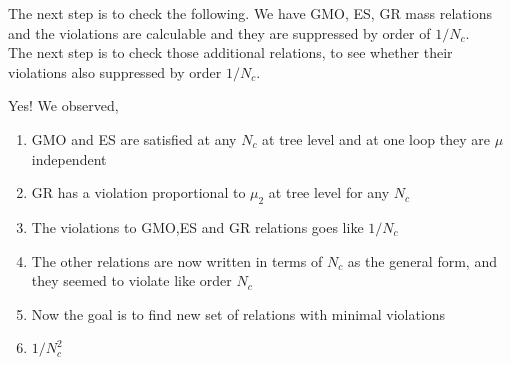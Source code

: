 \documentclass[10pt,a4paper]{article}
\begin{document}
The next step is to check the following.
We have GMO, ES, GR mass relations and the violations are calculable and they are suppressed by order of $1/N_c$.\\
The next step is to check those additional relations, to see whether their violations also suppressed by order $1/N_c$.


Yes! We observed,
\begin{enumerate}
	\item GMO and ES are satisfied at any $N_c$ at tree level and at one loop they are $\mu$ independent
	\item GR has a violation proportional to $\mu_2$ at tree level for any $N_c$
	\item The violations to GMO,ES and GR relations goes like $1/N_c$
	\item The other relations are now written in terms of $N_c$ as the general form, and they seemed to violate like order $N_c$
	\item Now the goal is to find new set of relations with minimal violations
	\item $1/N_c^2$
\end{enumerate}
\end{document}
